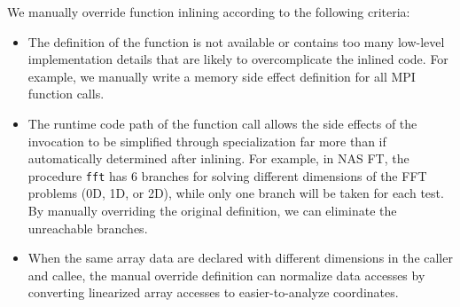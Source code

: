 We manually override function inlining according to the following criteria:
\begin{itemize}
\item The definition of the function is not available or contains too many low-level implementation details that are likely to overcomplicate the inlined code.
For example, we manually write a memory side effect definition for all MPI function calls.
\item The runtime code path of the function call allows the side effects of the invocation to be simplified through specialization far more than if automatically determined after inlining.
For example, in NAS FT, the procedure \texttt{fft} has 6 branches
  for solving different dimensions of the FFT problems (0D, 1D, or 2D),
  while only one branch will be taken for each test.
By manually overriding the original definition, we can eliminate the unreachable branches.
\item When the same array data are declared with different dimensions in the caller and callee,
  the manual override definition can normalize data accesses by converting linearized array accesses to easier-to-analyze coordinates.
\end{itemize}



